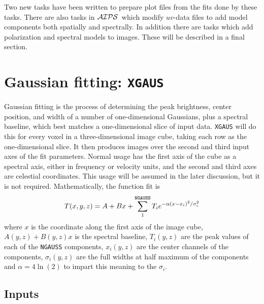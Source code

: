 \documentclass[twoside]{article}
\newcommand{\Me}[1]{\textcolor{mecol}{#1}}
\newcommand{\AIPS}{{$\cal AIPS\/$}}
\begin{document}
\Me{Two new tasks have been written to prepare plot files from the
fits done by these tasks.}  There are also tasks in \AIPS\ which
modify $uv$-data files to add model components both spatially and
spectrally.  In addition there are tasks which add polarization and
spectral models to images.  These will be described in a final
section.

\section{Gaussian fitting: {\tt XGAUS}}

Gaussian fitting is the process of determining the peak brightness,
center position, and width of a number of one-dimensional Gaussians,
plus a spectral baseline, which best matches a one-dimensional slice
of input data.  {\tt XGAUS} will do this for every voxel in a
three-dimensional image cube, taking each row as the one-dimensional
slice.  It then produces images over the second and third input axes
of the fit parameters.  Normal usage has the first axis of the cube as
a spectral axis, either in frequency or velocity units, and the second
and third axes are celestial coordinates.  This usage will be assumed
in the later discussion, but it is not required.  Mathematically, the
function fit is
\begin{equation}
  T(x,y,z) = A + Bx + \sum_1^{\tt NGAUSS} T_i e^{-\alpha (x - x_i)^2 /
     \sigma_i^2}
\end{equation}
where $x$ is the coordinate along the first axis of the image cube,
$A(y,z) + B(y,z)x$ is the spectral baseline, $T_i(y,z)$ are the peak
values of each of the {\tt NGAUSS} components, $x_i(y,z)$ are the
center channels of the components, $\sigma_i(y,z)$  are the full
widths at half maximum of the components and $\alpha = 4 \ln(2)$ to
impart this meaning to the $\sigma_i$.

\subsection{Inputs}
\end{document}
